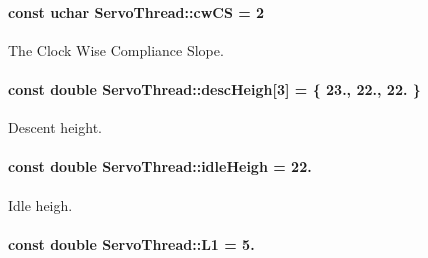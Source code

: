 \hypertarget{a00009_a67b2528edcaa375aefa1fb4117576665}{}
\paragraph[{cw\+C\+S}]{\setlength{\rightskip}{0pt plus 5cm}const uchar Servo\+Thread\+::cw\+C\+S = 2\hspace{0.3cm}{\ttfamily [private]}}\label{a00009_a67b2528edcaa375aefa1fb4117576665}


The Clock Wise Compliance Slope. 

\hypertarget{a00009_a9ca211d5d711c959689afd7fff5a897a}{}
\paragraph[{desc\+Heigh}]{\setlength{\rightskip}{0pt plus 5cm}const double Servo\+Thread\+::desc\+Heigh\mbox{[}3\mbox{]} = \{ 23., 22., 22. \}\hspace{0.3cm}{\ttfamily [private]}}\label{a00009_a9ca211d5d711c959689afd7fff5a897a}


Descent height. 

\hypertarget{a00009_aee236c1b7ec8fb4c35d7930d9393f643}{}
\paragraph[{idle\+Heigh}]{\setlength{\rightskip}{0pt plus 5cm}const double Servo\+Thread\+::idle\+Heigh = 22.\hspace{0.3cm}{\ttfamily [private]}}\label{a00009_aee236c1b7ec8fb4c35d7930d9393f643}


Idle heigh. 

\hypertarget{a00009_a6281142e50115dd8c914c14cfae6f90d}{}
\paragraph[{L1}]{\setlength{\rightskip}{0pt plus 5cm}const double Servo\+Thread\+::\+L1 = 5.\hspace{0.3cm}{\ttfamily [private]}}\label{a00009_a6281142e50115dd8c914c14cfae6f90d}


